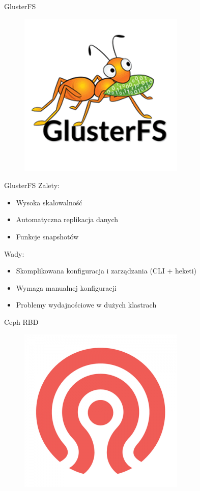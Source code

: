 \documentclass[polish,envcountsect,10pt]{beamer}
\begin{document}
\begin{frame}{GlusterFS}
	\begin{figure}[H]
    	\includegraphics[width=0.4\linewidth]{images/glusterFS.png}
	\end{figure}
\end{frame}

\begin{frame}{GlusterFS}
	Zalety:
	\begin{itemize}
		\item Wysoka skalowalność 
		\item Automatyczna replikacja danych 
		\item Funkcje snapshotów 
	\end{itemize}
	\medskip
	Wady:
	\begin{itemize}
		\item Skomplikowana konfiguracja i zarządzania (CLI + heketi) 
		\item Wymaga manualnej konfiguracji
		\item Problemy wydajnościowe w dużych klastrach
	\end{itemize}
\end{frame}

\begin{frame}{Ceph RBD}
	\begin{figure}[H]
    	\includegraphics[width=0.4\linewidth]{images/ceph.png}
	\end{figure}
\end{frame}
\end{document}
